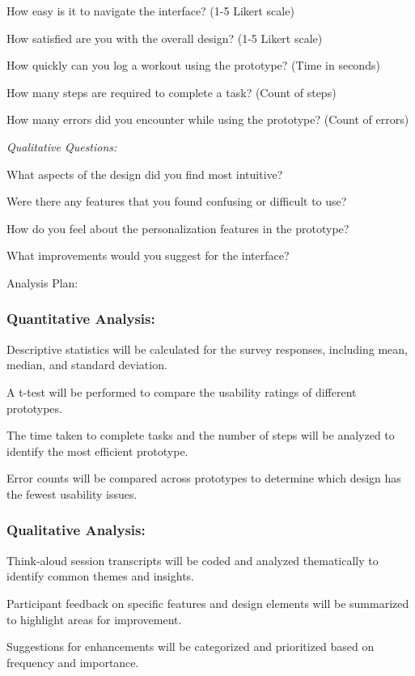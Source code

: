 \documentclass[
	letterpaper, %
]{jdf}
\begin{document}
How easy is it to navigate the interface? (1-5 Likert scale)

How satisfied are you with the overall design? (1-5 Likert scale)

How quickly can you log a workout using the prototype? (Time in seconds)

How many steps are required to complete a task? (Count of steps)

How many errors did you encounter while using the prototype? (Count of errors)

\textit{Qualitative Questions:}

What aspects of the design did you find most intuitive?

Were there any features that you found confusing or difficult to use?

How do you feel about the personalization features in the prototype?

What improvements would you suggest for the interface?

Analysis Plan:

 

\subsubsection{Quantitative Analysis:}

Descriptive statistics will be calculated for the survey responses, including mean, median, and standard deviation.

A t-test will be performed to compare the usability ratings of different prototypes.

The time taken to complete tasks and the number of steps will be analyzed to identify the most efficient prototype.

Error counts will be compared across prototypes to determine which design has the fewest usability issues.

\subsubsection{Qualitative Analysis:}

Think-aloud session transcripts will be coded and analyzed thematically to identify common themes and insights.

Participant feedback on specific features and design elements will be summarized to highlight areas for improvement.

Suggestions for enhancements will be categorized and prioritized based on frequency and importance.
\end{document}
